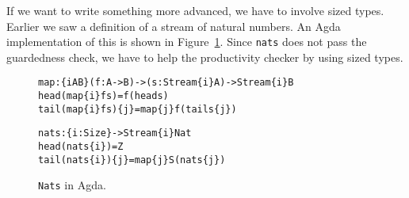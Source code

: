 If we want to write something more advanced, we have to involve sized types. Earlier we saw a definition of a stream of natural numbers. An Agda implementation of this is shown in Figure~\ref{fig:agda_nats}. Since \texttt{nats} does not pass the guardedness check, we have to help the productivity checker by using sized types.

\begin{figure}
\begin{alltt}
map : \{i A B\} (f : A -> B) -> (s : Stream \{i\} A) -> Stream \{i\} B
head (map \{i\} f s)     = f (head s)
tail (map \{i\} f s) \{j\} = map \{j\} f (tail s \{j\})

nats : \{i : Size\} -> Stream \{i\} Nat
head (nats \{i\})     = Z
tail (nats \{i\}) \{j\} = map \{j\} S (nats \{j\})
\end{alltt}
\caption{\texttt{Nats} in Agda.}
\label{fig:agda_nats}
\end{figure}
